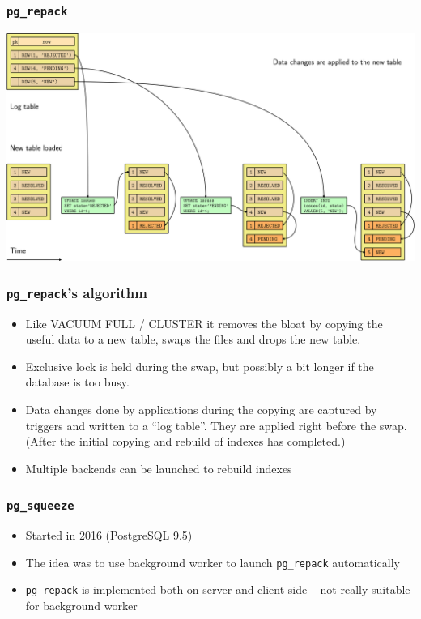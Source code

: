 \begin{frame}
  \frametitle{\texttt{pg\_repack}}
  \begin{center}
    \includegraphics[height=\sizeforimages\textheight]{images/pg_repack_02.png}
  \end{center}
\end{frame}

\begin{frame}
  \frametitle{\texttt{pg\_repack}'s algorithm}
  \begin{itemize}
    \item Like VACUUM FULL / CLUSTER it removes the bloat by copying the
      useful data to a new table, swaps the files and drops the new
      table.
    \item Exclusive lock is held during the swap, but possibly a bit longer if
      the database is too busy.
    \item Data changes done by applications during the copying are captured by
      triggers and written to a ``log table''. They are applied right before
      the swap. (After the initial copying and rebuild of indexes has
      completed.)
    \item Multiple backends can be launched to rebuild indexes
  \end{itemize}
\end{frame}

\begin{frame}
  \frametitle{\texttt{pg\_squeeze}}
  \begin{itemize}
    \item Started in 2016 (PostgreSQL 9.5)
    \item The idea was to use background worker to launch \texttt{pg\_repack} automatically
    \item \texttt{pg\_repack} is implemented both on server and client side --
      not really suitable for background worker
  \end{itemize}
\end{frame}

